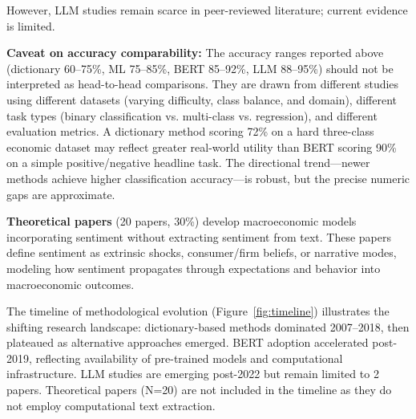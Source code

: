 \documentclass[11pt]{article}
\begin{document}
However, LLM studies remain scarce in peer-reviewed literature; current evidence is limited.

\textbf{Caveat on accuracy comparability:} The accuracy ranges reported above (dictionary 60--75\%, ML 75--85\%, BERT 85--92\%, LLM 88--95\%) should not be interpreted as head-to-head comparisons. They are drawn from different studies using different datasets (varying difficulty, class balance, and domain), different task types (binary classification vs. multi-class vs. regression), and different evaluation metrics. A dictionary method scoring 72\% on a hard three-class economic dataset may reflect greater real-world utility than BERT scoring 90\% on a simple positive/negative headline task. The directional trend---newer methods achieve higher classification accuracy---is robust, but the precise numeric gaps are approximate.

\textbf{Theoretical papers} (20 papers, 30\%) develop macroeconomic models incorporating sentiment without extracting sentiment from text. These papers define sentiment as extrinsic shocks, consumer/firm beliefs, or narrative modes, modeling how sentiment propagates through expectations and behavior into macroeconomic outcomes.

The timeline of methodological evolution (Figure~\ref{fig:timeline}) illustrates the shifting research landscape: dictionary-based methods dominated 2007--2018, then plateaued as alternative approaches emerged. BERT adoption accelerated post-2019, reflecting availability of pre-trained models and computational infrastructure. LLM studies are emerging post-2022 but remain limited to 2 papers. Theoretical papers (N=20) are not included in the timeline as they do not employ computational text extraction.
\end{document}
